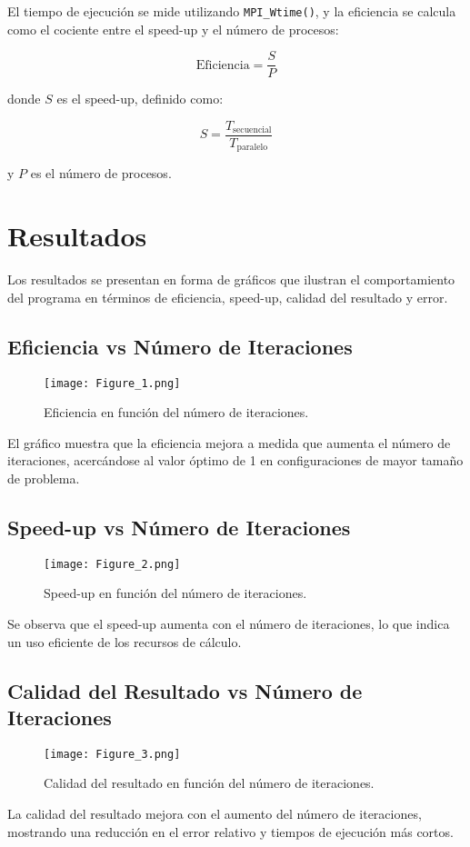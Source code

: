 \documentclass[conference, a4paper]{IEEEtran}
\begin{document}
El tiempo de ejecución se mide utilizando \texttt{MPI\_Wtime()}, y la eficiencia se calcula como el cociente entre el speed-up y el número de procesos:

\begin{equation}
\text{Eficiencia} = \frac{S}{P}
\end{equation}

donde \( S \) es el speed-up, definido como:

\begin{equation}
S = \frac{T_{\text{secuencial}}}{T_{\text{paralelo}}}
\end{equation}

y \( P \) es el número de procesos.

\section{Resultados}
Los resultados se presentan en forma de gráficos que ilustran el comportamiento del programa en términos de eficiencia, speed-up, calidad del resultado y error.

\subsection{Eficiencia vs Número de Iteraciones}
\begin{figure}[h!]
    \centering
    \texttt{[image: Figure\_1.png]}
    \caption{Eficiencia en función del número de iteraciones.}
    \label{fig:eficiencia}
\end{figure}
El gráfico muestra que la eficiencia mejora a medida que aumenta el número de iteraciones, acercándose al valor óptimo de 1 en configuraciones de mayor tamaño de problema.

\subsection{Speed-up vs Número de Iteraciones}
\begin{figure}[h!]
    \centering
    \texttt{[image: Figure\_2.png]}
    \caption{Speed-up en función del número de iteraciones.}
    \label{fig:speedup}
\end{figure}
Se observa que el speed-up aumenta con el número de iteraciones, lo que indica un uso eficiente de los recursos de cálculo.

\subsection{Calidad del Resultado vs Número de Iteraciones}
\begin{figure}[h!]
    \centering
    \texttt{[image: Figure\_3.png]}
    \caption{Calidad del resultado en función del número de iteraciones.}
    \label{fig:calidad}
\end{figure}
La calidad del resultado mejora con el aumento del número de iteraciones, mostrando una reducción en el error relativo y tiempos de ejecución más cortos.
\end{document}

